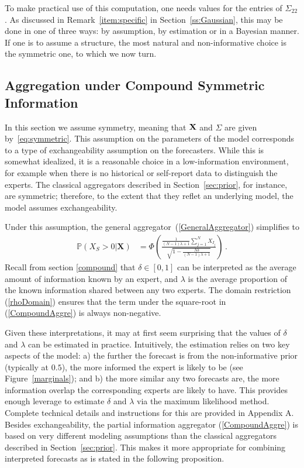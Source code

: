 \documentclass[11pt]{article}
\renewcommand{\P}{\mathbb{P}}
\theoremstyle{definition}
\theoremstyle{definition}
\def\P{{\mathbb P}}
\begin{document}
To make practical use of this computation, one needs values
for the entries of $\Sigma_{22}$.  As discussed in 
Remark~\ref{item:specific} in Section~\ref{ss:Gaussian},
this may be done in one of three ways: by assumption, 
by estimation or in a Bayesian manner.  If one is to assume
a structure, the most natural and non-informative choice is
the symmetric one, to which we now turn.


\subsection{Aggregation under Compound Symmetric Information}
\label{compound2}

In this section we assume symmetry, meaning that ${\bf X}$ and
$\Sigma$ are given by~\eqref{eq:symmetric}.  This assumption
on the parameters of the model corresponds to a type of exchangeability
assumption on the forecasters.  While this is somewhat idealized,
it is a reasonable choice in a low-information environment, for
example when there is no historical or self-report data to
distinguish the experts.  The classical aggregators described in 
Section~\ref{sec:prior}, for instance, are symmetric; therefore,
to the extent that they reflet an underlying model, the model 
assumes exchangeability.

Under this assumption, the general aggregator~(\ref{GeneralAggregator}) 
simplifies to
\begin{align}
\P\left(X_S > 0 | \boldsymbol{X}\right) 
  &=\Phi\left(\frac{\frac{1}{(N-1)\lambda +1} 
  \sum_{j=1}^N X_{I_j} }{\sqrt{1- \frac{N\delta}{(N-1)\lambda +1} }}  
  \right) \, . \label{CompoundAggre}
\end{align}
Recall from section \ref{compound} that $\delta \in [0,1]$ can be 
interpreted as the average amount of information known by an expert, 
and $\lambda$ is the average proportion of the known information shared 
between any two experts.  The domain restriction (\ref{rhoDomain}) 
ensures that the term under the square-root in (\ref{CompoundAggre}) 
is always non-negative.

Given these interpretations, it may at first seem surprising that 
the values of $\delta$ and $\lambda$ can be estimated in practice. 
Intuitively, the estimation relies on two key aspects of the model: 
a) the further the forecast is from the non-informative prior 
(typically at $0.5$), the more informed the expert is likely to be 
(see Figure~\ref{marginals}); and b) the more similar any two forecasts 
are, the more information overlap the corresponding experts are likely 
to have. This provides enough leverage to estimate $\delta$ and $\lambda$   
via the maximum likelihood method.  Complete technical details and 
instructions for this are provided in Appendix A.  Besides exchangeability, 
the partial information aggregator (\ref{CompoundAggre}) is based on 
very different modeling assumptions than the classical aggregators 
described in Section~\ref{sec:prior}. This makes it more appropriate 
for combining interpreted forecasts as is stated in the following 
proposition.
\end{document}
